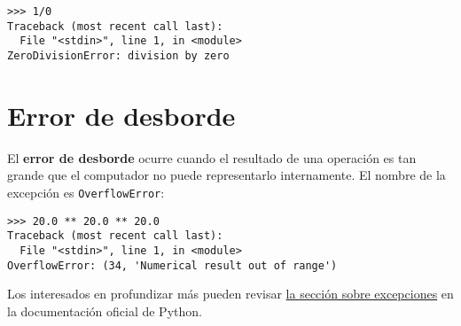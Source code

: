 \begin{lstlisting}
>>> 1/0
Traceback (most recent call last):
  File "<stdin>", line 1, in <module>
ZeroDivisionError: division by zero
\end{lstlisting}

\section{Error de desborde}

El \textbf{error de desborde} ocurre cuando el resultado de una
operación es tan grande que el computador no puede representarlo
internamente.
El nombre de la excepción es \lstinline!OverflowError!:

\begin{lstlisting}
>>> 20.0 ** 20.0 ** 20.0
Traceback (most recent call last):
  File "<stdin>", line 1, in <module>
OverflowError: (34, 'Numerical result out of range')
\end{lstlisting}

Los interesados en profundizar más pueden revisar
\href{http://docs.python.org/library/exceptions.html}{la sección sobre
excepciones} en la documentación oficial de Python.
